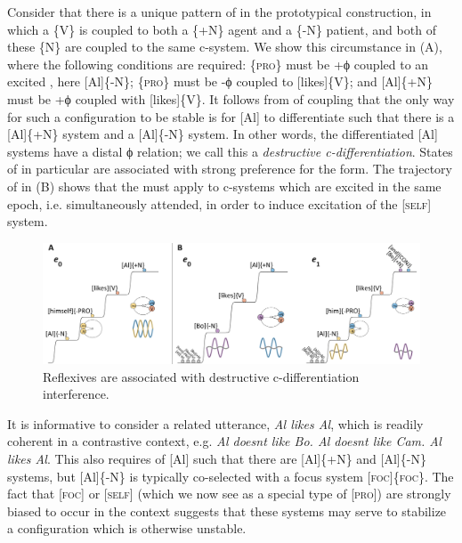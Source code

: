   Consider that there is a unique pattern of  in the prototypical  construction, in which a \{V\} is coupled to both a \{+N\} agent and a \{-N\} patient, and both of these \{N\} are coupled to the same c-system. We show this circumstance in {}(A), where the following conditions are required: \{\textsc{pro}\} must be +ϕ coupled to an excited , here [Al]\{-N\}; \{\textsc{pro}\} must be -ϕ coupled to [likes]\{V\}; and [Al]\{+N\} must be +ϕ coupled with [likes]\{V\}. It follows from  of coupling that the only way for such a configuration to be stable is for [Al] to differentiate such that there is a [Al]\{+N\} system and a [Al]\{-N\} system. In other words, the differentiated [Al] systems have a distal ϕ relation; we call this a \textit{destructive c-differentiation}. States of  in particular are associated with strong preference for the  form. The trajectory of  in {}(B) shows that the  must apply to c-systems which are excited in the same epoch, i.e. simultaneously attended, in order to induce excitation of the [\textsc{self}] system. 

\ea\label{ex:7:15}
 \label{ex:7:15a} 
  \label{ex:7:15b}
\z
\z
  
\begin{figure}
\includegraphics[width=\textwidth]{figures/Tilsen-img156.png}
\caption{Reflexives are associated with destructive c-differentiation interference.}
\label{fig:7:12}
\end{figure}
 

  It is informative to consider a related utterance, \textit{Al likes Al}, which is readily coherent in a contrastive context, e.g. \textit{Al doesnt like Bo. Al doesnt like Cam. Al likes Al}. This also requires  of [Al] such that there are [Al]\{+N\} and [Al]\{-N\} systems, but [Al]\{-N\} is typically co-selected with a focus system [\textsc{foc}]\{\textsc{foc}\}. The fact that [\textsc{foc}] or [\textsc{self}] (which we now see as a special type of [\textsc{pro}]) are strongly biased to occur in the  context suggests that these systems may serve to stabilize a configuration which is otherwise unstable.

